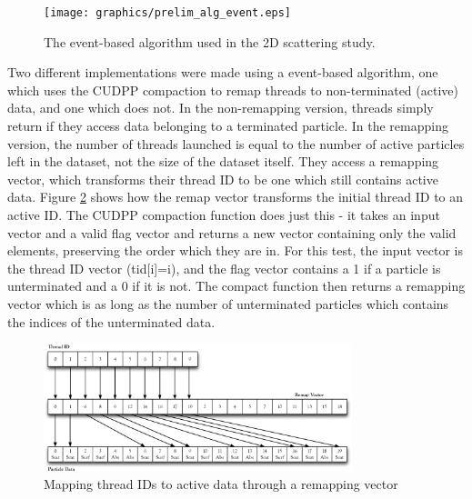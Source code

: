 \begin{figure}[h!] 
  \centering
    \texttt{[image: graphics/prelim\_alg\_event.eps]}
     \caption{The event-based algorithm used in the 2D scattering study. \label{prelim_alg_event} }
\end{figure}

Two different implementations were made using a event-based algorithm, one which uses the CUDPP compaction to remap threads to non-terminated (active) data, and one which does not.  In the non-remapping version, threads simply return if they access data belonging to a terminated particle.  In the remapping version, the number of threads launched is equal to the number of active particles left in the dataset, not the size of the dataset itself.  They access a remapping vector, which transforms their thread ID to be one which still contains active data.  Figure \ref{remapping} shows how the remap vector transforms the initial thread ID to an active ID.  The CUDPP compaction function does just this - it takes an input vector and a valid flag vector and returns a new vector containing only the valid elements, preserving the order which they are in.  For this test, the input vector is the thread ID vector (tid[i]=i), and the flag vector contains a 1 if a particle is unterminated and a 0 if it is not.  The compact function then returns a remapping vector which is as long as the number of unterminated particles which contains the indices of the unterminated data.

\begin{figure}[h!] 
  \centering
    \includegraphics[width=0.8\textwidth]{graphics/remapping_horiz.eps}
     \caption{Mapping thread IDs to active data through a remapping vector \label{remapping} }
\end{figure}

